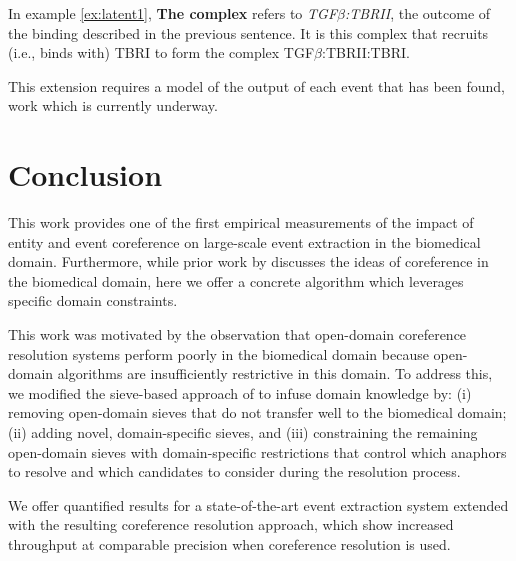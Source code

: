 In example \ref{ex:latent1}, {\bf The complex} refers to {\it TGF$\beta$:TBRII}, the outcome of the binding described in the 
previous sentence. It is this complex that recruits (i.e., binds with) TBRI to form the complex TGF$\beta$:TBRII:TBRI.

This extension requires a model of the output of each event that has been found, work which is currently underway.

\section{Conclusion}

This work provides one of the first empirical measurements of the impact of entity and event coreference on large-scale event extraction in the biomedical domain. Furthermore, while prior work by  discusses the ideas of coreference in the biomedical domain, here we offer a concrete algorithm which leverages specific domain constraints.

This work was motivated by the observation that open-domain coreference resolution systems perform poorly in the biomedical domain because open-domain algorithms are insufficiently restrictive in this domain. To address this, we modified the sieve-based approach of  to infuse domain knowledge by: (i) removing open-domain sieves that do not transfer well to the biomedical domain; (ii) adding novel, domain-specific sieves, and (iii) constraining the remaining open-domain sieves with domain-specific restrictions that control which anaphors to resolve and which candidates to consider during the resolution process. 

We offer quantified results for a state-of-the-art event extraction system extended with the resulting coreference resolution approach, which show increased throughput at comparable precision when coreference resolution is used.

